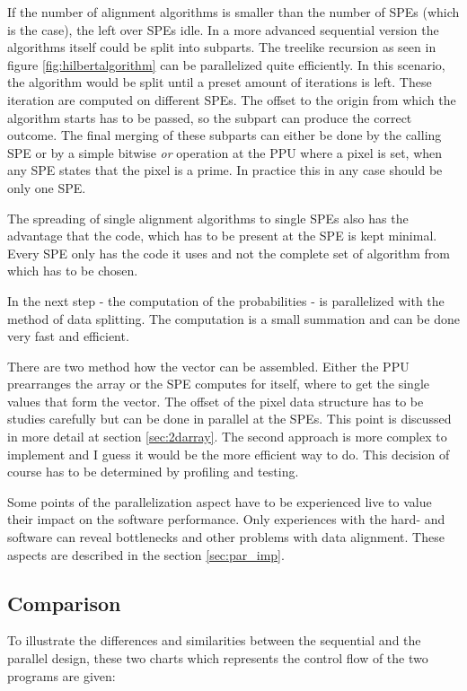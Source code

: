If the number of alignment algorithms is smaller than the number of SPEs (which is the case), the left over SPEs idle. In a more advanced sequential version the algorithms itself could be split into subparts. The treelike  recursion as seen in figure \ref{fig:hilbertalgorithm} can be parallelized quite efficiently. In this scenario, the algorithm would be split until a preset amount of iterations is left. These iteration are computed on different SPEs. The offset to the origin from which the algorithm starts has to be passed, so the subpart can produce the correct outcome. The final merging of these subparts can either be done by the calling SPE or by a simple bitwise \emph{or} operation at the PPU where a pixel is set, when any SPE states that the pixel is a prime. In practice this in any case should be only one SPE.

The spreading of single alignment algorithms to single SPEs also has the advantage that the code, which has to be present at the SPE is kept minimal. Every SPE only has the code it uses and not the complete set of algorithm from which has to be chosen.

In the next step - the computation of the probabilities - is parallelized with the method of data splitting. The computation is a small summation and can be done very fast and efficient.

There are two method how the vector can be assembled. Either the PPU prearranges the array or the SPE computes for itself, where to get the single values that form the vector.  The offset of the pixel data structure has to be studies carefully but can be done in parallel at the SPEs. This point is discussed in more detail at section \ref{sec:2darray}. The second approach is more complex to implement and I guess it would be the more efficient way to do. This decision of course has to be determined by profiling and testing.


Some points of the parallelization aspect have to be experienced live to value their impact on the software performance. Only experiences with the hard- and software can reveal bottlenecks and other problems with data alignment. These aspects are described in the section \ref{sec:par_imp}.

\subsection{Comparison}
\label{sec:designcomp}

To illustrate the differences and similarities between the sequential and the parallel design, these two charts which represents the control flow of the two programs are given:

